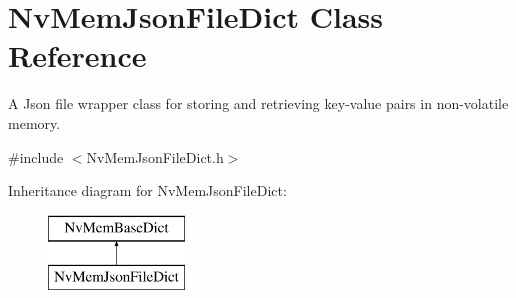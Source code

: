 \hypertarget{class_nv_mem_json_file_dict}{}\section{Nv\+Mem\+Json\+File\+Dict Class Reference}
\label{class_nv_mem_json_file_dict}


A Json file wrapper class for storing and retrieving key-\/value pairs in non-\/volatile memory.  




{\ttfamily \#include $<$Nv\+Mem\+Json\+File\+Dict.\+h$>$}

Inheritance diagram for Nv\+Mem\+Json\+File\+Dict\+:\begin{figure}[H]
\begin{center}
\leavevmode
\includegraphics[height=2.000000cm]{class_nv_mem_json_file_dict}
\end{center}
\end{figure}
